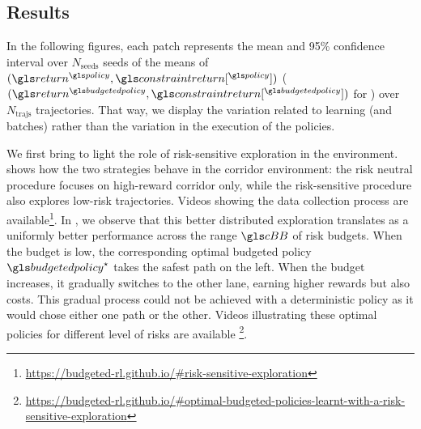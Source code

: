 \subsection{Results}
\label{subsec:results}
In the following figures, each patch represents the mean and 95\% confidence interval over $N_{\text{seeds}}$ seeds of the means of $(\return^{\policy},\constraintreturn[^{\policy}])$ ($(\return^{\budgetedpolicy},\constraintreturn[^{\budgetedpolicy}])$ for \BFTQ) over $N_\text{trajs}$ trajectories. That way, we display the variation related to learning (and batches) rather than the variation in the execution of the policies.

We first bring to light the role of risk-sensitive exploration in the  environment.  shows how the two strategies behave in the corridor environment: the risk neutral procedure focuses on high-reward corridor only, while the risk-sensitive procedure also explores low-risk trajectories. Videos showing the data collection process are available\footnote{\href{https://budgeted-rl.github.io/\#risk-sensitive-exploration}{https://budgeted-rl.github.io/\#risk-sensitive-exploration}}. In , we observe that this better distributed exploration translates as a uniformly better performance across the range $\budgetspace$ of risk budgets. 
When the budget is low, the corresponding optimal budgeted policy $\budgetedpolicy^\star$ takes the safest path on the left. When the budget increases, it gradually switches to the other lane, earning higher rewards but also costs. This gradual process could not be achieved with a deterministic policy as it would chose either one path or the other. Videos illustrating these optimal policies for different level of risks are available \footnote{\href{https://budgeted-rl.github.io/\#optimal-budgeted-policies-learnt-with-a-risk-sensitive-exploration}{https://budgeted-rl.github.io/\#optimal-budgeted-policies-learnt-with-a-risk-sensitive-exploration}}.

